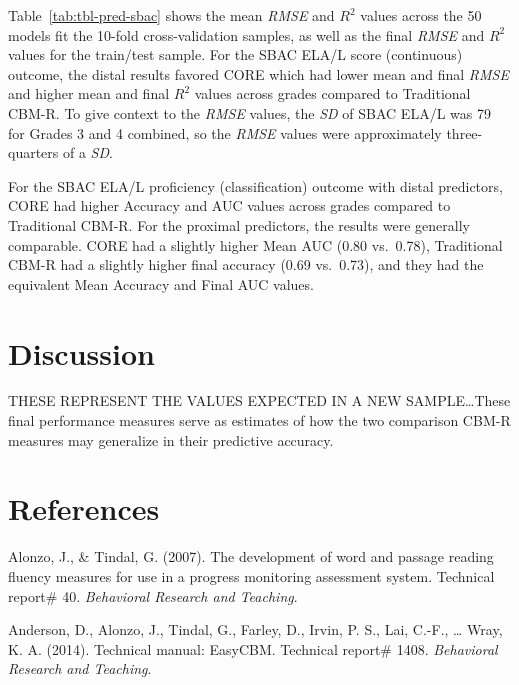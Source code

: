 \documentclass[
  english,
  man, fleqn, noextraspace]{apa6}
\begin{document}
Table~\ref{tab:tbl-pred-sbac} shows the mean \emph{RMSE} and \(R^2\) values across the 50 models fit the 10-fold cross-validation samples, as well as the final \emph{RMSE} and \(R^2\) values for the train/test sample. For the SBAC ELA/L score (continuous) outcome, the distal results favored CORE which had lower mean and final \emph{RMSE} and higher mean and final \(R^2\) values across grades compared to Traditional CBM-R. To give context to the \emph{RMSE} values, the \emph{SD} of SBAC ELA/L was 79 for Grades 3 and 4 combined, so the \emph{RMSE} values were approximately three-quarters of a \emph{SD}.

For the SBAC ELA/L proficiency (classification) outcome with distal predictors, CORE had higher Accuracy and AUC values across grades compared to Traditional CBM-R. For the proximal predictors, the results were generally comparable. CORE had a slightly higher Mean AUC (0.80 vs.~0.78), Traditional CBM-R had a slightly higher final accuracy (0.69 vs.~0.73), and they had the equivalent Mean Accuracy and Final AUC values.

\hypertarget{discussion}{%
\section{Discussion}\label{discussion}}

THESE REPRESENT THE VALUES EXPECTED IN A NEW SAMPLE\ldots These final performance measures serve as estimates of how the two comparison CBM-R measures may generalize in their predictive accuracy.

\newpage

\hypertarget{references}{%
\section{References}\label{references}}

\begingroup
\setlength{\parindent}{-0.5in}
\setlength{\leftskip}{0.5in}

\hypertarget{refs}{}
\leavevmode\hypertarget{ref-alonzotindal2007}{}%
Alonzo, J., \& Tindal, G. (2007). The development of word and passage reading fluency measures for use in a progress monitoring assessment system. Technical report\# 40. \emph{Behavioral Research and Teaching}.

\leavevmode\hypertarget{ref-anderson2014tech}{}%
Anderson, D., Alonzo, J., Tindal, G., Farley, D., Irvin, P. S., Lai, C.-F., \ldots{} Wray, K. A. (2014). Technical manual: EasyCBM. Technical report\# 1408. \emph{Behavioral Research and Teaching}.
\end{document}
